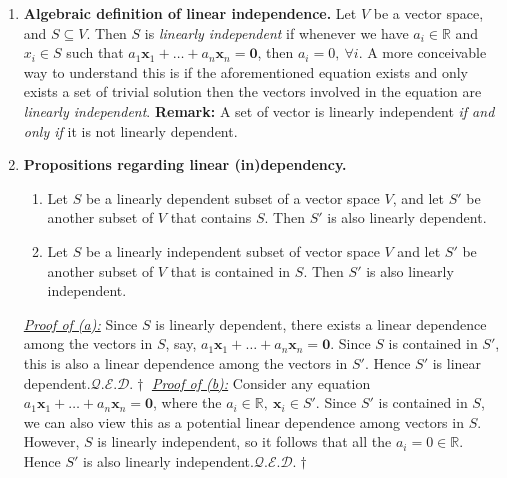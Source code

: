 \documentclass[oneside, 12pt]{book}
\newcommand{\settag}[1]{\renewcommand{\theenumi}{#1}}
\newcommand{\R}{\mathbb{R}}
\newcommand{\qed}{\hfill $\mathcal{Q}.\mathcal{E}.\mathcal{D}.\dagger$}
\newcommand{\tbf}[1]{\textbf{#1}}
\newcommand{\tit}[1]{\textit{#1}}
\newcommand{\vzero}{\mathbf{0}}
\begin{document}
\begin{enumerate}
        \settag{1.4.4}
        \item \textbf{Algebraic definition of linear independence.} Let $V$ be a vector space, and $S\subseteq V$. Then $S$ is \textit{linearly independent} if whenever we have $a_i\in \R$ and $x_i\in S$ such that $a_1\mathbf{x}_1+\ldots+a_n\mathbf{x}_n = \vzero$, then $a_i = 0,~\forall i$. A more conceivable way to understand this is if the aforementioned equation exists and only exists a set of trivial solution then the vectors involved in the equation are \textit{linearly independent}. \newline \tbf{Remark: }A set of vector is linearly independent \tit{if and only if} it is not linearly dependent.
        
        \settag{1.4.7}
        \item \textbf{Propositions regarding linear (in)dependency.}
            \begin{enumerate}
                \item Let $S$ be a linearly dependent subset of a vector space $V$, and let $S'$ be another subset of $V$ that contains $S$. Then $S'$ is also linearly dependent.
                \item Let $S$ be a linearly independent subset of vector space $V$ and let $S'$ be another subset of $V$ that is contained in $S$. Then $S'$ is also linearly independent.
            \end{enumerate}
        \underline{\tit{Proof of (a):}}
        Since $S$ is linearly dependent, there exists a linear dependence among the vectors in $S$, say, $a_1\mathbf{x}_1 + \ldots+ a_n\mathbf{x}_n = \vzero$. Since $S$ is contained in $S'$, this is also a linear dependence among the vectors in $S'$. Hence $S'$ is linear dependent.\qed\newline
        \underline{\tit{Proof of (b):}}
        Consider any equation $a_1\mathbf{x}_1 + \ldots+ a_n\mathbf{x}_n = \vzero$, where the $a_i \in \R,~\mathbf{x}_i \in S'$. Since $S'$ is contained in $S$, we can also view this as a potential linear dependence among vectors in $S$. However, $S$ is linearly independent, so it follows that all the $a_i = 0\in \R$. Hence $S'$ is also linearly independent.\qed
        

\end{enumerate}
\end{document}
